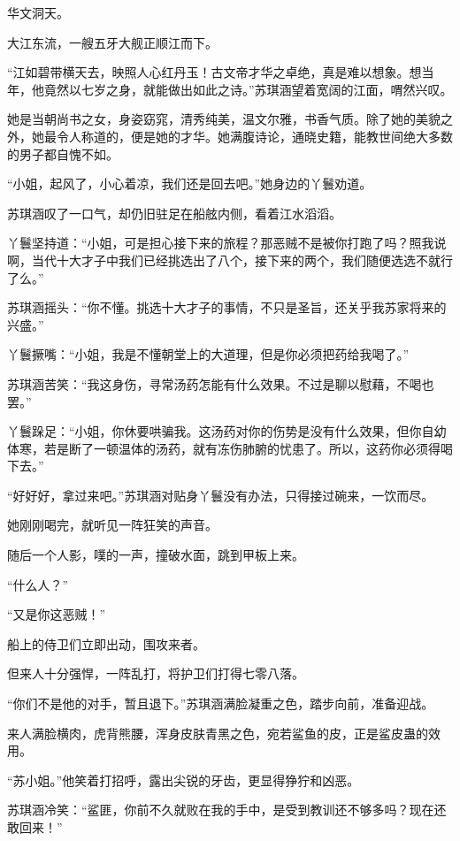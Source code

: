 
\begin{this_body}

华文洞天。

大江东流，一艘五牙大舰正顺江而下。

“江如碧带横天去，映照人心红丹玉！古文帝才华之卓绝，真是难以想象。想当年，他竟然以七岁之身，就能做出如此之诗。”苏琪涵望着宽阔的江面，喟然兴叹。

她是当朝尚书之女，身姿窈窕，清秀纯美，温文尔雅，书香气质。除了她的美貌之外，她最令人称道的，便是她的才华。她满腹诗论，通晓史籍，能教世间绝大多数的男子都自愧不如。

“小姐，起风了，小心着凉，我们还是回去吧。”她身边的丫鬟劝道。

苏琪涵叹了一口气，却仍旧驻足在船舷内侧，看着江水滔滔。

丫鬟坚持道：“小姐，可是担心接下来的旅程？那恶贼不是被你打跑了吗？照我说啊，当代十大才子中我们已经挑选出了八个，接下来的两个，我们随便选选不就行了么。”

苏琪涵摇头：“你不懂。挑选十大才子的事情，不只是圣旨，还关乎我苏家将来的兴盛。”

丫鬟撅嘴：“小姐，我是不懂朝堂上的大道理，但是你必须把药给我喝了。”

苏琪涵苦笑：“我这身伤，寻常汤药怎能有什么效果。不过是聊以慰藉，不喝也罢。”

丫鬟跺足：“小姐，你休要哄骗我。这汤药对你的伤势是没有什么效果，但你自幼体寒，若是断了一顿温体的汤药，就有冻伤肺腑的忧患了。所以，这药你必须得喝下去。”

“好好好，拿过来吧。”苏琪涵对贴身丫鬟没有办法，只得接过碗来，一饮而尽。

她刚刚喝完，就听见一阵狂笑的声音。

随后一个人影，噗的一声，撞破水面，跳到甲板上来。

“什么人？”

“又是你这恶贼！”

船上的侍卫们立即出动，围攻来者。

但来人十分强悍，一阵乱打，将护卫们打得七零八落。

“你们不是他的对手，暂且退下。”苏琪涵满脸凝重之色，踏步向前，准备迎战。

来人满脸横肉，虎背熊腰，浑身皮肤青黑之色，宛若鲨鱼的皮，正是鲨皮蛊的效用。

“苏小姐。”他笑着打招呼，露出尖锐的牙齿，更显得狰狞和凶恶。

苏琪涵冷笑：“鲨匪，你前不久就败在我的手中，是受到教训还不够多吗？现在还敢回来！”


\end{this_body}
